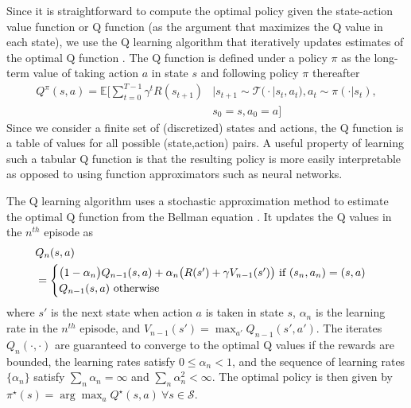 \documentclass[sigconf]{acmart}
\begin{document}
Since it is straightforward to compute the optimal policy given the state-action value function or Q function (as the argument that maximizes the Q value in each state), we use the Q learning algorithm that iteratively updates estimates of the optimal Q function \cite{watkins1992q}. The Q function is defined under a policy $\pi$ as the long-term value of taking action $a$ in state $s$ and following policy $\pi$ thereafter \begin{equation}
    \begin{aligned}
        Q^\pi(s,a)=\mathbb{E}\bigg[\sum_{t=0}^{T-1}
\gamma^tR(s_{t+1})&\bigg|s_{t+1}\sim\mathcal{T}\big(\cdot|s_t,a_t\big),a_t\sim\pi(\cdot|s_t),\\
&s_0=s,a_0=a\bigg]
    \end{aligned}\label{eq:q}
\end{equation}
Since we consider a finite set of (discretized) states and actions, the Q function is a table of values for all possible (state,action) pairs. A useful property of learning such a tabular Q function is that the resulting policy is more easily interpretable as opposed to using function approximators such as neural networks. 

The Q learning algorithm uses a stochastic approximation method to estimate the optimal Q function from the Bellman equation \cite{robbins1951stochastic,gladyshev1965stochastic}. It updates the Q values in the $n^{th}$ episode as \begin{equation}
\begin{aligned}
    &Q_n(s,a)\\
&=\begin{cases}
\big(1-\alpha_n\big)Q_{n-1}(s,a)+\alpha_n\big(R(s')+\gamma V_{n-1}(s')\big)\textnormal{ if }(s_n,a_n)=(s,a)\\
Q_{n-1}(s,a)\textnormal{ otherwise}
\end{cases}
    \end{aligned}\label{eq:qlearning}
\end{equation}
where $s'$ is the next state when action $a$ is taken in state $s$, $\alpha_n$ is the learning rate in the $n^{th}$ episode, and $V_{n-1}(s')=\max_{a'}Q_{n-1}(s',a')$. The iterates $Q_n(\cdot,\cdot)$ are guaranteed to converge to the optimal Q values if the rewards are bounded, the learning rates satisfy $0\leq\alpha_n<1$, and the sequence of learning rates $\lbrace\alpha_n\rbrace$ satisfy $\sum_n\alpha_n=\infty$ and $\sum_n\alpha_n^2<\infty$. The optimal policy is then given by $\pi^\star(s)=\arg\max_aQ^\star(s,a)\ \forall s\in\mathcal{S}$.
\end{document}
